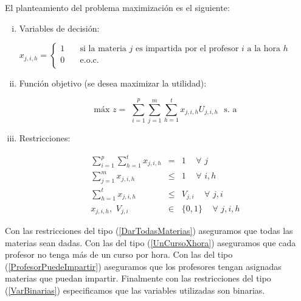 El planteamiento del problema maximización es el siguiente:

\begin{enumerate}[i)]
\item Variables de decisión:
  
  $ x_{j,i,h} =
  \begin{cases}
1  & \quad \text{si la materia } j \text{ es impartida por el profesor  } i \text{ a la hora } h\\
0  & \quad \text{e.o.c. } \\
\end{cases}
$
  
  \item Función objetivo (se desea maximizar la utilidad):

\begin{equation*}
\text{máx} \,\, z =  \,\, \displaystyle \sum_{i=1}^{p} \sum_{j=1}^{m} \sum_{h=1}^{t} x_{j,i,h} U_{j,i,h} \,\,\,\, \text{s. a}
\end{equation*}

\item Restricciones:
  
  \begin{eqnarray}
\displaystyle \sum_{i=1}^{p} \sum_{h=1}^{t} x_{j,i,h} &=& 1  \,\,\,\,\,\,\, \forall \,\, j\label{DarTodasMaterias}\\
\displaystyle \sum_{j=1}^{m} x_{j,i,h} &\leqslant& 1 \,\,\,\,\,\,\, \forall \,\, i,h \label{UnCursoXhora}\\
\displaystyle \sum_{h=1}^{t} x_{j,i,h} &\leqslant& V_{j,i} \,\,\,\,\,\,\, \forall \,\, j,i \label{ProfesorPuedeImpartir}\\
x_{j,i,h}, \,\, V_{j,i} &\in& \{0,1\} \,\,\,\,\,\,\, \forall \,\, j,i,h \label{VarBinarias}
\end{eqnarray}
\end{enumerate}

Con las restricciones del tipo (\ref{DarTodasMaterias}) aseguramos que todas las materias sean dadas. Con las del tipo (\ref{UnCursoXhora}) aseguramos que cada profesor no tenga más de un curso por hora. Con las del tipo (\ref{ProfesorPuedeImpartir}) aseguramos que los profesores tengan asignadas materias que puedan impartir. Finalmente con las restricciones del tipo (\ref{VarBinarias}) especificamos que las variables utilizadas son binarias.



